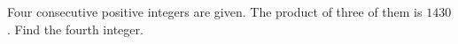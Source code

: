 Four consecutive positive integers are given. The product of three of them is $1430$. Find the fourth integer.

